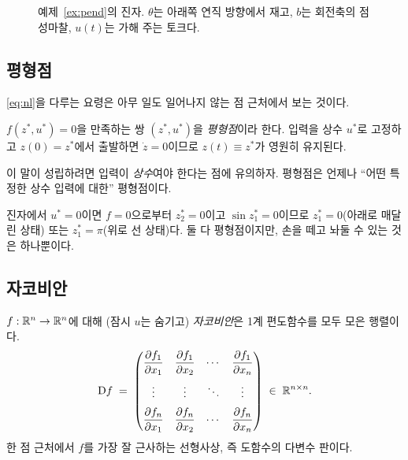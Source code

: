 \documentclass[11pt]{article}
\begin{document}
\begin{figure}[htb]
\centering
{}
\caption{예제~\ref{ex:pend}의 진자. $\theta$는 아래쪽 연직 방향에서 재고, $b$는
회전축의 점성마찰, $u(t)$는 가해 주는 토크다.}
\label{fig:pend}
\end{figure}

\subsection{평형점} \eqref{eq:nl}을 다루는 요령은 아무 일도 일어나지 않는 점
근처에서 보는 것이다.

\begin{definition}[평형점]\label{def:eq}
$f(z^{*},u^{*}) = 0$을 만족하는 쌍 $(z^{*},u^{*})$을 \emph{평형점}이라 한다.
입력을 상수 $u^{*}$로 고정하고 $z(0)=z^{*}$에서 출발하면 $\dot z=0$이므로
$z(t)\equiv z^{*}$가 영원히 유지된다.
\end{definition}
이 말이 성립하려면 입력이 \emph{상수}여야 한다는 점에 유의하자. 평형점은 언제나
``어떤 특정한 상수 입력에 대한'' 평형점이다.

진자에서 $u^{*}=0$이면 $f=0$으로부터 $z_2^{*}=0$이고 $\sin z_1^{*}=0$이므로
$z_1^{*}=0$(아래로 매달린 상태) 또는 $z_1^{*}=\pi$(위로 선 상태)다. 둘 다
평형점이지만, 손을 떼고 놔둘 수 있는 것은 하나뿐이다.

\subsection{자코비안}
$f:\mathbb{R}^{n}\to\mathbb{R}^{n}$에 대해 (잠시 $u$는 숨기고) \emph{자코비안}은 1계 편도함수를
모두 모은 행렬이다.
\[
   \mathrm{D} f \;=\;
   \begin{pmatrix}
     \dfrac{\partial f_1}{\partial x_1} & \dfrac{\partial f_1}{\partial x_2} & \cdots & \dfrac{\partial f_1}{\partial x_n}\\[10pt]
     \vdots & \vdots & \ddots & \vdots\\[6pt]
     \dfrac{\partial f_n}{\partial x_1} & \dfrac{\partial f_n}{\partial x_2} & \cdots & \dfrac{\partial f_n}{\partial x_n}
   \end{pmatrix}
   \;\in\;\mathbb{R}^{n\times n}.
\]
한 점 근처에서 $f$를 가장 잘 근사하는 선형사상, 즉 도함수의 다변수 판이다.
\end{document}
